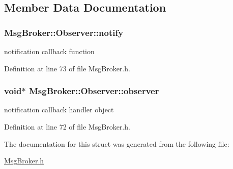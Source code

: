 \subsection{Member Data Documentation}
\hypertarget{struct_msg_broker_1_1_observer_aaa03c3efb2eae0b13212b9e11a47754b}{
\subsubsection[{notify}]{ Msg\-Broker\-::\-Observer\-::notify}}\label{struct_msg_broker_1_1_observer_aaa03c3efb2eae0b13212b9e11a47754b}


notification callback function 



Definition at line 73 of file Msg\-Broker.\-h.

\hypertarget{struct_msg_broker_1_1_observer_a7999f6189d65b41fb3c60a0d90b93de7}{
\subsubsection[{observer}]{\setlength{\rightskip}{0pt plus 5cm}void$\ast$ Msg\-Broker\-::\-Observer\-::observer}}\label{struct_msg_broker_1_1_observer_a7999f6189d65b41fb3c60a0d90b93de7}


notification callback handler object 



Definition at line 72 of file Msg\-Broker.\-h.



The documentation for this struct was generated from the following file\-:\begin{DoxyCompactItemize}
\item 
\hyperlink{_msg_broker_8h}{Msg\-Broker.\-h}\end{DoxyCompactItemize}
